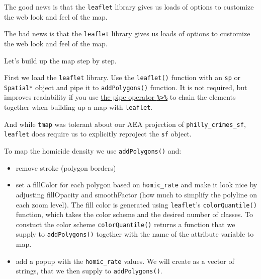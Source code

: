 \documentclass[]{book}
\newenvironment{Shaded}{\begin{snugshade}}{\end{snugshade}}
\newcommand{\KeywordTok}[1]{\textcolor[rgb]{0.13,0.29,0.53}{\textbf{#1}}}
\newcommand{\DecValTok}[1]{\textcolor[rgb]{0.00,0.00,0.81}{#1}}
\newcommand{\StringTok}[1]{\textcolor[rgb]{0.31,0.60,0.02}{#1}}
\newcommand{\CommentTok}[1]{\textcolor[rgb]{0.56,0.35,0.01}{\textit{#1}}}
\newcommand{\OperatorTok}[1]{\textcolor[rgb]{0.81,0.36,0.00}{\textbf{#1}}}
\newcommand{\NormalTok}[1]{#1}
\providecommand{\tightlist}{%
  \setlength{\itemsep}{0pt}\setlength{\parskip}{0pt}}
\begin{document}
The good news is that the \texttt{leaflet} library gives us loads of
options to customize the web look and feel of the map.

The bad news is that the \texttt{leaflet} library gives us loads of
options to customize the web look and feel of the map.

Let's build up the map step by step.

First we load the \texttt{leaflet} library. Use the \texttt{leaflet()}
function with an \texttt{sp} or \texttt{Spatial*} object and pipe it to
\texttt{addPolygons()} function. It is not required, but improves
readability if you use \href{https://github.com/tidyverse/magrittr}{the
pipe operator \texttt{\%\textgreater{}\%}} to chain the elements
together when building up a map with \texttt{leaflet}.

And while \texttt{tmap} was tolerant about our AEA projection of
\texttt{philly\_crimes\_sf}, \texttt{leaflet} does require us to
explicitly reproject the \texttt{sf} object.

\begin{Shaded}
\end{Shaded}

\hypertarget{htmlwidget-efe98f31523f93920651}{}

To map the homicide density we use \texttt{addPolygons()} and:

\begin{itemize}
\tightlist
\item
  remove stroke (polygon borders)\\
\item
  set a fillColor for each polygon based on \texttt{homic\_rate} and
  make it look nice by adjusting fillOpacity and smoothFactor (how much
  to simplify the polyline on each zoom level). The fill color is
  generated using \texttt{leaflet}'s \texttt{colorQuantile()} function,
  which takes the color scheme and the desired number of classes. To
  constuct the color scheme \texttt{colorQuantile()} returns a function
  that we supply to \texttt{addPolygons()} together with the name of the
  attribute variable to map.\\
\item
  add a popup with the \texttt{homic\_rate} values. We will create as a
  vector of strings, that we then supply to \texttt{addPolygons()}.
\end{itemize}
\end{document}
